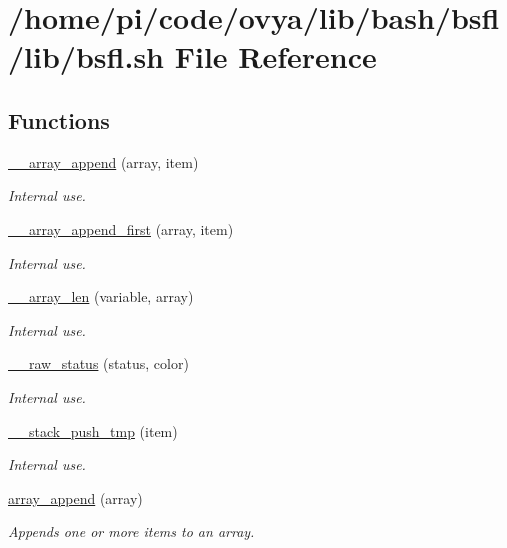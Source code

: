 \hypertarget{bsfl_8sh}{}\section{/home/pi/code/ovya/lib/bash/bsfl/lib/bsfl.sh File Reference}
\label{bsfl_8sh}
\subsection*{Functions}
\begin{DoxyCompactItemize}
\item 
\hyperlink{group__array_gac1b58f87f18e51bccf0da88bb38a5254}{\+\_\+\+\_\+array\+\_\+append} (array, item)
\begin{DoxyCompactList}\small\item\em Internal use. \end{DoxyCompactList}\item 
\hyperlink{group__array_ga3b7dcece91caedf4e175177904b54b5d}{\+\_\+\+\_\+array\+\_\+append\+\_\+first} (array, item)
\begin{DoxyCompactList}\small\item\em Internal use. \end{DoxyCompactList}\item 
\hyperlink{group__array_gace906062785f41cb3c5d3eb8e791ece7}{\+\_\+\+\_\+array\+\_\+len} (variable, array)
\begin{DoxyCompactList}\small\item\em Internal use. \end{DoxyCompactList}\item 
\hyperlink{group__message_gab8cefae01bd7be88bdefd3f719682cc2}{\+\_\+\+\_\+raw\+\_\+status} (status, color)
\begin{DoxyCompactList}\small\item\em Internal use. \end{DoxyCompactList}\item 
\hyperlink{group__stack_gadcb01cc6a3fd500b1e9a180ff299fa1f}{\+\_\+\+\_\+stack\+\_\+push\+\_\+tmp} (item)
\begin{DoxyCompactList}\small\item\em Internal use. \end{DoxyCompactList}\item 
\hyperlink{group__array_gaee08f787b133a7f4203367622b6f8b9b}{array\+\_\+append} (array)
\begin{DoxyCompactList}\small\item\em Appends one or more items to an array. \end{DoxyCompactList}\item 

\end{DoxyCompactItemize}
